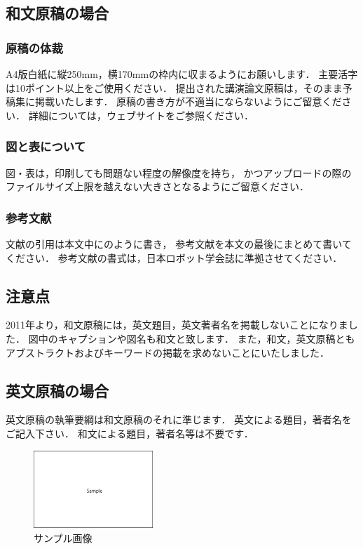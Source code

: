\subsection{和文原稿の場合}
\subsubsection{原稿の体裁}
A4版白紙に縦250mm，横170mmの枠内に収まるようにお願いします．
主要活字は10ポイント以上をご使用ください．
提出された講演論文原稿は，そのまま予稿集に掲載いたします．
原稿の書き方が不適当にならないようにご留意ください．
詳細については，ウェブサイト\cite{website}をご参照ください．
\subsubsection{図と表について}
図・表は，印刷しても問題ない程度の解像度を持ち，
かつアップロードの際のファイルサイズ上限を越えない大きさとなるようにご留意ください．
\subsubsection{参考文献}
文献の引用は本文中に\cite{yamada2000}のように書き，
参考文献を本文の最後にまとめて書いてください．
参考文献の書式は，日本ロボット学会誌に準拠させてください．

\subsection{注意点}
2011年より，和文原稿には，英文題目，英文著者名を掲載しないことになりました．
図中のキャプションや図名も和文と致します．
また，和文，英文原稿ともアブストラクトおよびキーワードの掲載を求めないことにいたしました．

\subsection{英文原稿の場合}
英文原稿の執筆要綱は和文原稿のそれに準じます．
英文による題目，著者名をご記入下さい．
和文による題目，著者名等は不要です．

\begin{figure}[tb]
    \centering
        \includegraphics[width=45mm]{210520_samplefig2.eps}
        \caption{サンプル画像}
        \label{fig:sample}
\end{figure}

